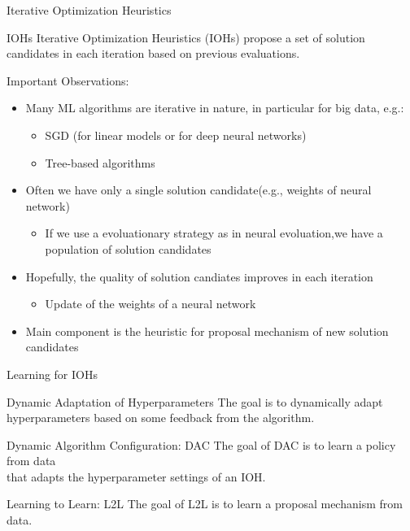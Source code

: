 \begin{frame}[c]{Iterative Optimization Heuristics}

\begin{block}{IOHs}
	Iterative Optimization Heuristics (IOHs) propose a set of solution candidates in each iteration
	based on previous evaluations.
\end{block}

\pause
\smallskip
Important Observations:
\begin{itemize}
	\item Many ML algorithms are  \alert{iterative} in nature, in particular for big data, e.g.:
	\begin{itemize}
		\item SGD (for linear models or for deep neural networks)
		\item Tree-based algorithms
	\end{itemize}
	\pause
	\smallskip
	\item Often we have only a \alert{single solution candidate}\newline (e.g., weights of neural network)
	\begin{itemize}
		\item If we use a evoluationary strategy as in neural evoluation,\newline we have a population of solution candidates
	\end{itemize}
	\pause
	\smallskip
	\item Hopefully, the \alert{quality} of solution candiates \alert{improves} in each iteration
	\begin{itemize}
		\item Update of the weights of a neural network
	\end{itemize}
	\pause
	\smallskip
	\item Main component is the \alert{heuristic for proposal mechanism} of new solution candidates
\end{itemize}

\end{frame}
\begin{frame}[c]{Learning for IOHs}

\begin{block}{Dynamic Adaptation of Hyperparameters}
	The goal is to dynamically adapt hyperparameters based on some feedback from the algorithm.
\end{block}

\bigskip
\pause	

\begin{block}{Dynamic Algorithm Configuration: DAC}
	The goal of DAC is to learn a policy from data\\ that adapts the \alert{hyperparameter settings} of an IOH.
\end{block}

\bigskip
\pause

\begin{block}{Learning to Learn: L2L}
	The goal of L2L is to learn a \alert{proposal mechanism} from data.
\end{block}
	
\end{frame}
